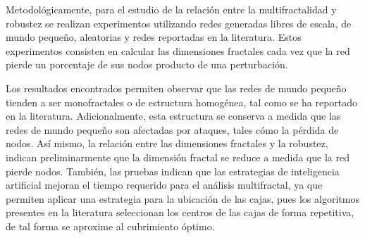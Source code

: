 Metodológicamente, para el estudio de la relación entre la multifractalidad y robustez se realizan experimentos utilizando redes generadas libres de escala, de mundo pequeño, aleatorias y redes reportadas en la literatura. Estos experimentos consisten en calcular las dimensiones fractales cada vez que la red pierde un porcentaje de sus nodos producto de una perturbación. 

Los resultados encontrados permiten observar que las redes de mundo pequeño tienden a ser monofractales o de estructura homogénea, tal como se ha reportado en la literatura. Adicionalmente, esta estructura se conserva a medida que las redes de mundo pequeño son afectadas por ataques, tales cómo la pérdida de nodos. Así mismo, la relación entre las dimensiones fractales y la robustez, indican preliminarmente que la dimensión fractal se reduce a medida que la red pierde nodos. También, las pruebas indican que las estrategias de inteligencia artificial mejoran el tiempo requerido para el análisis multifractal, ya que permiten aplicar una estrategia para la ubicación de las cajas, pues los algoritmos presentes en la literatura seleccionan los centros de las cajas de forma repetitiva, de tal forma se aproxime al cubrimiento óptimo.